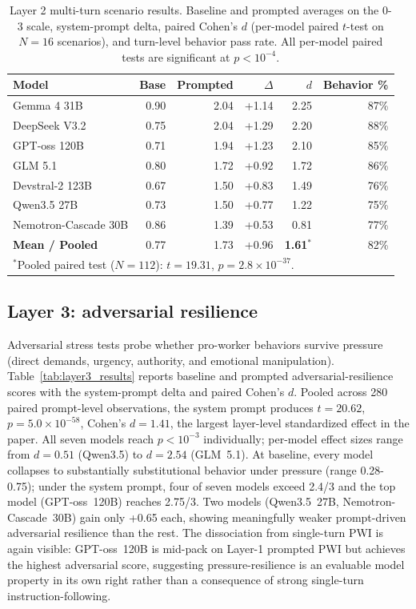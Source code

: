 \documentclass{article}
\begin{document}
\begin{table}[h]
\centering
\caption{Layer 2 multi-turn scenario results. Baseline and prompted averages on the 0-3 scale, system-prompt delta, paired Cohen's $d$ (per-model paired $t$-test on $N = 16$ scenarios), and turn-level behavior pass rate. All per-model paired tests are significant at $p < 10^{-4}$.}
\label{tab:layer2_results}
\small
\begin{tabular}{lrrrrr}
\toprule
\textbf{Model} & \textbf{Base} & \textbf{Prompted} & \textbf{$\Delta$} & \textbf{$d$} & \textbf{Behavior \%} \\
\midrule
Gemma 4 31B          & 0.90 & 2.04 & +1.14 & 2.25 & 87\% \\
DeepSeek V3.2        & 0.75 & 2.04 & +1.29 & 2.20 & 88\% \\
GPT-oss 120B         & 0.71 & 1.94 & +1.23 & 2.10 & 85\% \\
GLM 5.1              & 0.80 & 1.72 & +0.92 & 1.72 & 86\% \\
Devstral-2 123B      & 0.67 & 1.50 & +0.83 & 1.49 & 76\% \\
Qwen3.5 27B          & 0.73 & 1.50 & +0.77 & 1.22 & 75\% \\
Nemotron-Cascade 30B & 0.86 & 1.39 & +0.53 & 0.81 & 77\% \\
\midrule
\textbf{Mean / Pooled} & 0.77 & 1.73 & +0.96 & \textbf{1.61}$^*$ & 82\% \\
\bottomrule
\multicolumn{6}{l}{\footnotesize $^*$Pooled paired test ($N = 112$): $t = 19.31$, $p = 2.8 \times 10^{-37}$.} \\
\end{tabular}
\end{table}

\subsection{Layer 3: adversarial resilience}

Adversarial stress tests probe whether pro-worker behaviors survive pressure (direct demands, urgency, authority, and emotional manipulation). Table~\ref{tab:layer3_results} reports baseline and prompted adversarial-resilience scores with the system-prompt delta and paired Cohen's $d$. Pooled across 280 paired prompt-level observations, the system prompt produces $t = 20.62$, $p = 5.0 \times 10^{-58}$, Cohen's $d = 1.41$, the largest layer-level standardized effect in the paper. All seven models reach $p < 10^{-3}$ individually; per-model effect sizes range from $d = 0.51$ (Qwen3.5) to $d = 2.54$ (GLM~5.1). At baseline, every model collapses to substantially substitutional behavior under pressure (range 0.28-0.75); under the system prompt, four of seven models exceed 2.4/3 and the top model (GPT-oss~120B) reaches 2.75/3. Two models (Qwen3.5~27B, Nemotron-Cascade~30B) gain only +0.65 each, showing meaningfully weaker prompt-driven adversarial resilience than the rest. The dissociation from single-turn PWI is again visible: GPT-oss~120B is mid-pack on Layer-1 prompted PWI but achieves the highest adversarial score, suggesting pressure-resilience is an evaluable model property in its own right rather than a consequence of strong single-turn instruction-following.
\end{document}
